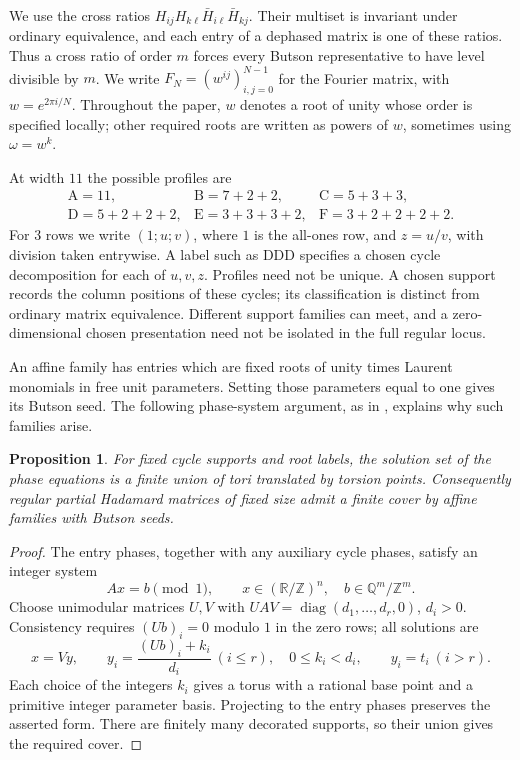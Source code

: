 \documentclass[11pt,a4paper]{article}
\newtheorem{proposition}[theorem]{Proposition}
\theoremstyle{plain}
\theoremstyle{definition}
\theoremstyle{plain}
\begin{document}
We use the cross ratios $H_{ij}H_{k\ell}\bar H_{i\ell}\bar H_{kj}$. Their multiset is invariant under ordinary equivalence, and each entry of a dephased matrix is one of these ratios. Thus a cross ratio of order $m$ forces every Butson representative to have level divisible by $m$. We write $F_N=(w^{ij})_{i,j=0}^{N-1}$ for the Fourier matrix, with $w=e^{2\pi i/N}$. Throughout the paper, $w$ denotes a root of unity whose order is specified locally; other required roots are written as powers of $w$, sometimes using $\omega=w^k$.

At width $11$ the possible profiles are
$$\begin{array}{lll}\mathrm{A}=11,&\mathrm{B}=7+2+2,&\mathrm{C}=5+3+3,\\\mathrm{D}=5+2+2+2,&\mathrm{E}=3+3+3+2,&\mathrm{F}=3+2+2+2+2.\end{array}$$
For $3$ rows we write $(1;u;v)$, where $1$ is the all-ones row, and $z=u/v$, with division taken entrywise. A label such as $\mathrm{DDD}$ specifies a chosen cycle decomposition for each of $u,v,z$. Profiles need not be unique. A chosen support records the column positions of these cycles; its classification is distinct from ordinary matrix equivalence. Different support families can meet, and a zero-dimensional chosen presentation need not be isolated in the full regular locus.

An affine family has entries which are fixed roots of unity times Laurent monomials in free unit parameters. Setting those parameters equal to one gives its Butson seed. The following phase-system argument, as in \cite{regular78}, explains why such families arise.

\par\addvspace{\medskipamount}\noindent
\begin{minipage}{\linewidth}
\begin{proposition}\label{n11_phase:affine}
For fixed cycle supports and root labels, the solution set of the phase equations is a finite union of tori translated by torsion points. Consequently regular partial Hadamard matrices of fixed size admit a finite cover by affine families with Butson seeds.
\end{proposition}
\end{minipage}
\par\addvspace{\medskipamount}

\begin{proof}
The entry phases, together with any auxiliary cycle phases, satisfy an integer system
$$Ax=b\pmod1,\qquad x\in(\mathbb R/\mathbb Z)^n,\quad b\in\mathbb Q^m/\mathbb Z^m.$$
Choose unimodular matrices $U,V$ with $UAV=\operatorname{diag}(d_1,\ldots,d_r,0)$, $d_i>0$. Consistency requires $(Ub)_i=0$ modulo $1$ in the zero rows; all solutions are
$$x=Vy,\qquad y_i=\frac{(Ub)_i+k_i}{d_i}\ (i\le r),\quad 0\le k_i<d_i,\qquad y_i=t_i\ (i>r).$$
Each choice of the integers $k_i$ gives a torus with a rational base point and a primitive integer parameter basis. Projecting to the entry phases preserves the asserted form. There are finitely many decorated supports, so their union gives the required cover.
\end{proof}
\end{document}
